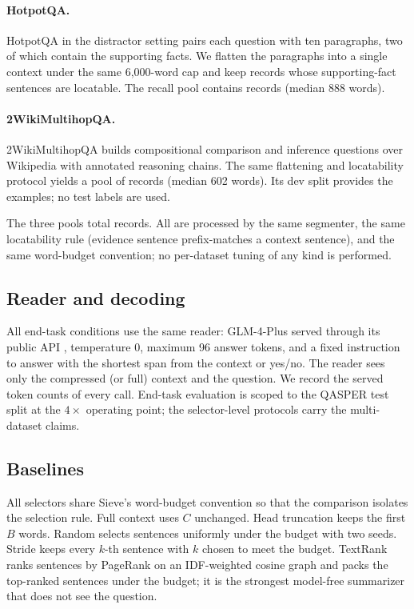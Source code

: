 \documentclass[review,12pt]{elsarticle}
\theoremstyle{remark}
\newcommand{\method}{Sieve}
\begin{document}
\paragraph{HotpotQA.}
HotpotQA \citep{yang2018hotpotqa} in the distractor setting pairs each
question with ten paragraphs, two of which contain the supporting
facts. We flatten the paragraphs into a single context under the same
6{,}000-word cap and keep records whose supporting-fact sentences are
locatable. The recall pool contains \NRecH{} records (median 888
words).

\paragraph{2WikiMultihopQA.}
2WikiMultihopQA \citep{ho2020wiki} builds compositional comparison and
inference questions over Wikipedia with annotated reasoning chains.
The same flattening and locatability protocol yields a pool of
\NRecW{} records (median 602 words). Its dev split provides the
examples; no test labels are used.

The three pools total \TotalRecords{} records. All are processed by
the same segmenter, the same locatability rule (evidence sentence
prefix-matches a context sentence), and the same word-budget
convention; no per-dataset tuning of any kind is performed.

\subsection{Reader and decoding}
All end-task conditions use the same reader: GLM-4-Plus served through
its public API \citep{glm2024chatglm}, temperature $0$, maximum 96
answer tokens, and a fixed instruction to answer with the shortest
span from the context or yes/no. The reader sees only the compressed
(or full) context and the question. We record the served token counts
of every call. End-task evaluation is scoped to the QASPER test split
at the $4\times$ operating point; the selector-level protocols carry
the multi-dataset claims.

\subsection{Baselines}
\label{sec:baselines}
All selectors share \method{}'s word-budget convention so that the
comparison isolates the selection rule. Full context uses $C$
unchanged. Head truncation keeps the first $B$ words. Random selects
sentences uniformly under the budget with two seeds. Stride keeps
every $k$-th sentence with $k$ chosen to meet the budget. TextRank
\citep{mihalcea2004textrank} ranks sentences by PageRank on an
IDF-weighted cosine graph and packs the top-ranked sentences under the
budget; it is the strongest model-free summarizer that does not see
the question.
\end{document}
